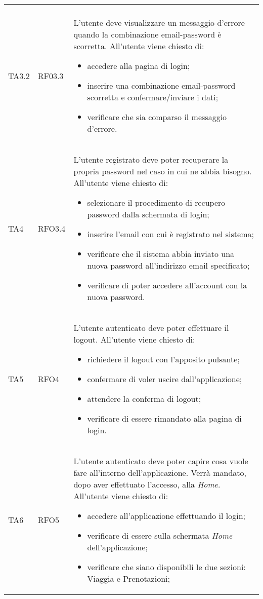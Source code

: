 \begin{longtable}{ >{\centering}p{} >{\centering}p{} >{\centering}p{}
			}
\begin{itemize}
		 \end{itemize} 	\tabularnewline
		 TA3.2 & RF03.3 &	L'utente deve visualizzare un messaggio d'errore quando la combinazione email-password è scorretta. All'utente viene chiesto di:
		 \begin{itemize}
		 	\item accedere alla pagina di login;
		 	\item inserire una combinazione email-password scorretta e confermare/inviare i dati;
		 	\item verificare che sia comparso il messaggio d'errore.
		 \end{itemize} 	\tabularnewline
		 TA4 & RFO3.4	&	L'utente registrato deve poter recuperare la propria password nel caso in cui ne abbia bisogno. All'utente viene chiesto di:
		 \begin{itemize}
		 	\item selezionare il procedimento di recupero password dalla schermata di login;
		 	\item inserire l'email con cui è registrato nel sistema;
		 	\item verificare che il sistema abbia inviato una nuova password all'indirizzo email specificato;
		 	\item verificare di poter accedere all'account con la nuova password.
		 \end{itemize}		\tabularnewline
		 TA5	& RFO4 &	L'utente autenticato deve poter effettuare il logout. All'utente viene chiesto di:
		 \begin{itemize}
		 	\item richiedere il logout con l'apposito pulsante;
		 	\item confermare di voler uscire dall'applicazione;
		 	\item attendere la conferma di logout;
		 	\item verificare di essere rimandato alla pagina di login.
		 \end{itemize} 	\tabularnewline
	 	 TA6	& RFO5 & L'utente autenticato deve poter capire cosa vuole fare all'interno dell'applicazione. Verrà mandato, dopo aver effettuato l'accesso, alla \textit{Home}. 
	 	 All'utente viene chiesto di:
	 	 \begin{itemize}
	 	 	\item accedere all'applicazione effettuando il login;
	 	 	\item verificare di essere sulla schermata \textit{Home} dell'applicazione;
	 	 	\item verificare che siano disponibili le due sezioni: Viaggia e Prenotazioni;

\end{itemize}
\end{longtable}
